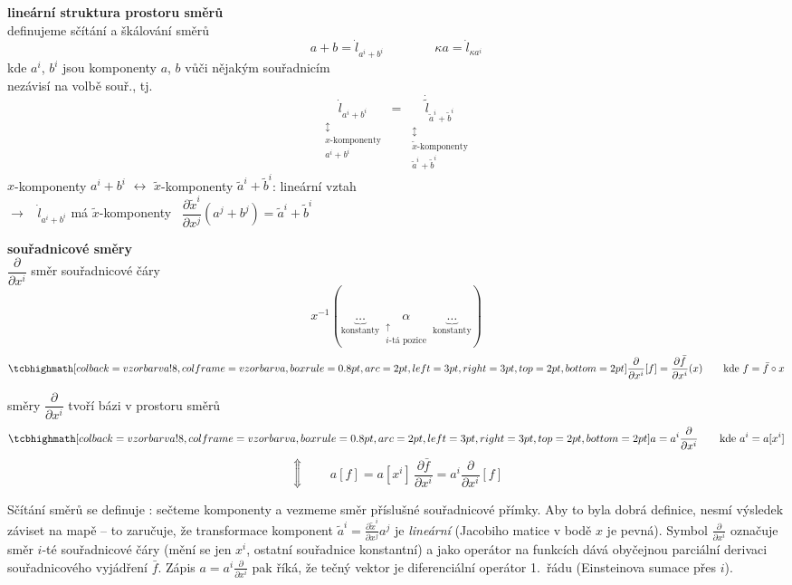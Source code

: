\textbf{lineární struktura prostoru směrů} \\
\quad definujeme sčítání a škálování směrů
\[
  a + b = \dot l_{a^i+b^i} \qquad\qquad \kappa a = \dot l_{\kappa a^i}
\]
\quad kde $a^i$, $b^i$ jsou komponenty $a$, $b$ vůči nějakým souřadnicím \\
\quad nezávisí na volbě souř., tj.
\[
  \underset{\substack{\updownarrow\\ x\text{-komponenty}\\ a^i + b^i}}{\dot l_{a^i+b^i}}
  \;=\;
  \underset{\substack{\updownarrow\\ \tilde x\text{-komponenty}\\ \tilde a^i + \tilde b^i}}{\dot{\tilde l}_{\tilde a^i+\tilde b^i}}
\]
\quad $x$-komponenty $a^i+b^i$ $\longleftrightarrow$ $\tilde x$-komponenty $\tilde a^i+\tilde b^i$: lineární vztah \\
\quad $\to$ \ $\dot l_{a^i+b^i}$ má $\tilde x$-komponenty \
$\dfrac{\partial\tilde x^i}{\partial x^j}(a^j+b^j) = \tilde a^i + \tilde b^i$

\textbf{souřadnicové směry} \\
\quad $\dfrac{\partial}{\partial x^i}$ \quad směr souřadnicové čáry
\[
  x^{-1}(\underbrace{\dots}_{\text{konstanty}}\ \underset{\substack{\uparrow\\ i\text{-tá pozice}}}{\alpha}\ \underbrace{\dots}_{\text{konstanty}})
\]
\[
  \vzorec{\frac{\partial}{\partial x^i}[f] = \frac{\partial\bar f}{\partial x^i}(x)} \qquad\text{kde } f = \bar f\circ x
\]

směry $\dfrac{\partial}{\partial x^i}$ tvoří bázi v prostoru směrů
\[
  \vzorec{a = a^i\frac{\partial}{\partial x^i}} \qquad\text{kde } a^i = a[x^i]
\]
\[
  \Updownarrow\qquad a[f] = a[x^i]\,\frac{\partial\bar f}{\partial x^i} = a^i\frac{\partial}{\partial x^i}[f]
\]

\begin{vysvetleni}
Sčítání směrů se definuje : sečteme komponenty a vezmeme směr příslušné souřadnicové přímky. Aby to byla dobrá definice, nesmí výsledek záviset na mapě -- to zaručuje, že transformace komponent $\tilde a^i=\frac{\partial\tilde x^i}{\partial x^j}a^j$ je \emph{lineární} (Jacobiho matice v bodě $x$ je pevná). Symbol $\frac{\partial}{\partial x^i}$ označuje směr $i$-té souřadnicové čáry (mění se jen $x^i$, ostatní souřadnice konstantní) a jako operátor na funkcích dává obyčejnou parciální derivaci souřadnicového vyjádření $\bar f$. Zápis $a=a^i\frac{\partial}{\partial x^i}$ pak říká, že tečný vektor je diferenciální operátor 1.~řádu (Einsteinova sumace přes $i$).
\end{vysvetleni}

